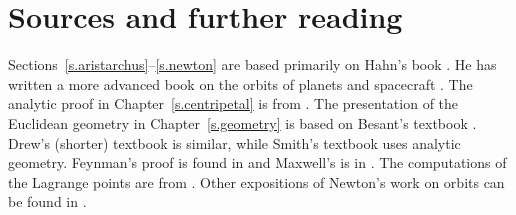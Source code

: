 
\chapter*{Sources and further reading}


Sections~\ref{s.aristarchus}--\ref{s.newton} are based primarily on Hahn's book \cite{hahn-cic}. He has written a more advanced book on the orbits of planets and spacecraft \cite{hahn-orbits}. The analytic proof in Chapter~\ref{s.centripetal} is from \cite{griffiths}. The presentation of the Euclidean geometry in Chapter~\ref{s.geometry} is based on Besant's textbook \cite{besant}. Drew's (shorter) textbook \cite{drew} is similar, while Smith's textbook \cite{smith} uses analytic geometry. Feynman's proof is found in \cite{lost} and Maxwell's is in \cite[Article CXXXIII]{maxwell}. The computations of the Lagrange points are from \cite{stern}. Other expositions of Newton's work on orbits can be found in \cite{hauser-lang,stein}. 

\begin{small}


\end{small}
